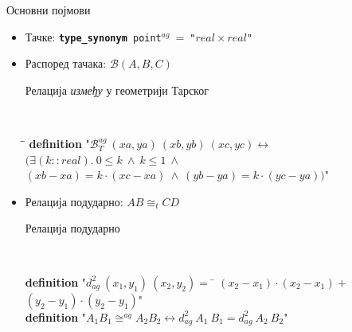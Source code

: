\documentclass[slidestop, compress, mathserif, containsverbatim, xcolor=dvipsnames]{beamer}
\newcommand{\agbett}[3]{\ensuremath{\mathcal{B}_T^{\mathit{ag}}\ #1\ #2\ #3}}
\newcommand{\agcongr}[4]{\ensuremath{#1#2 \cong^{ag} #3#4}}
\newcommand{\agsqdist}[2]{\ensuremath{d^2_{ag}\ #1\ #2}}
\newcommand{\congrt}[4]{\ensuremath{#1#2 \cong_t #3#4}}
\begin{document}
\begin{frame}{Основни појмови}
  \begin{itemize}
  \item Тачке: {\tt {\bf type\_synonym}\ point$^{ag}\ =\ $"$real \times real$"\ }
  \item Распоред тачака: $\mathcal{B}(A, B, C)$
    \begin{block}{Релација \emph{између} у геометрији Тарског}
      {\tt
        \begin{tabbing}
          \hspace{5mm}\=\hspace{5mm}\=\kill
          {\bf definition} "$\agbett{(xa, ya)}{(xb, yb)}{(xc, yc)} \longleftrightarrow$\\
      \>$(\exists (k::real).\ 0 \le k \ \wedge\ k \le 1 \ \wedge$\\
      \>\>$(xb - xa) = k \cdot (xc - xa) \ \wedge\ (yb - ya) = k \cdot (yc - ya))$"
        \end{tabbing}
      }
    \end{block}
  \item Релација подударно: $\congrt{A}{B}{C}{D}$
    \begin{block}{Релација подударно}
      {\tt
        \begin{tabbing}
          {\bf definition} "$\agsqdist{(x_1, y_1)}{(x_2, y_2)} =$ \= $(x_2-x_1)\cdot (x_2-x_1)+$ \\
           \> $(y_2-y_1)\cdot (y_2-y_1)$"\\
          {\bf definition} "$\agcongr{A_1}{B_1}{A_2}{B_2} \longleftrightarrow \agsqdist{A_1}{B_1} = \agsqdist{A_2}{B_2}$"
        \end{tabbing}
      }
    \end{block}
  \end{itemize}
\end{frame}
\end{document}
